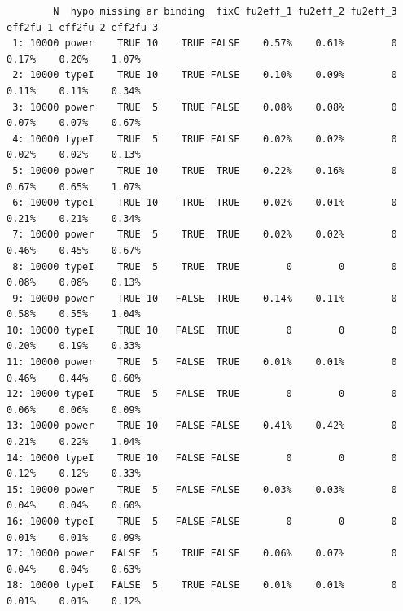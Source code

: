 \documentclass[12pt]{article}
\begin{document}
\begin{verbatim}
        N  hypo missing ar binding  fixC fu2eff_1 fu2eff_2 fu2eff_3 eff2fu_1 eff2fu_2 eff2fu_3
 1: 10000 power    TRUE 10    TRUE FALSE    0.57%    0.61%        0    0.17%    0.20%    1.07%
 2: 10000 typeI    TRUE 10    TRUE FALSE    0.10%    0.09%        0    0.11%    0.11%    0.34%
 3: 10000 power    TRUE  5    TRUE FALSE    0.08%    0.08%        0    0.07%    0.07%    0.67%
 4: 10000 typeI    TRUE  5    TRUE FALSE    0.02%    0.02%        0    0.02%    0.02%    0.13%
 5: 10000 power    TRUE 10    TRUE  TRUE    0.22%    0.16%        0    0.67%    0.65%    1.07%
 6: 10000 typeI    TRUE 10    TRUE  TRUE    0.02%    0.01%        0    0.21%    0.21%    0.34%
 7: 10000 power    TRUE  5    TRUE  TRUE    0.02%    0.02%        0    0.46%    0.45%    0.67%
 8: 10000 typeI    TRUE  5    TRUE  TRUE        0        0        0    0.08%    0.08%    0.13%
 9: 10000 power    TRUE 10   FALSE  TRUE    0.14%    0.11%        0    0.58%    0.55%    1.04%
10: 10000 typeI    TRUE 10   FALSE  TRUE        0        0        0    0.20%    0.19%    0.33%
11: 10000 power    TRUE  5   FALSE  TRUE    0.01%    0.01%        0    0.46%    0.44%    0.60%
12: 10000 typeI    TRUE  5   FALSE  TRUE        0        0        0    0.06%    0.06%    0.09%
13: 10000 power    TRUE 10   FALSE FALSE    0.41%    0.42%        0    0.21%    0.22%    1.04%
14: 10000 typeI    TRUE 10   FALSE FALSE        0        0        0    0.12%    0.12%    0.33%
15: 10000 power    TRUE  5   FALSE FALSE    0.03%    0.03%        0    0.04%    0.04%    0.60%
16: 10000 typeI    TRUE  5   FALSE FALSE        0        0        0    0.01%    0.01%    0.09%
17: 10000 power   FALSE  5    TRUE FALSE    0.06%    0.07%        0    0.04%    0.04%    0.63%
18: 10000 typeI   FALSE  5    TRUE FALSE    0.01%    0.01%        0    0.01%    0.01%    0.12%
\end{verbatim}

\clearpage
\end{document}
